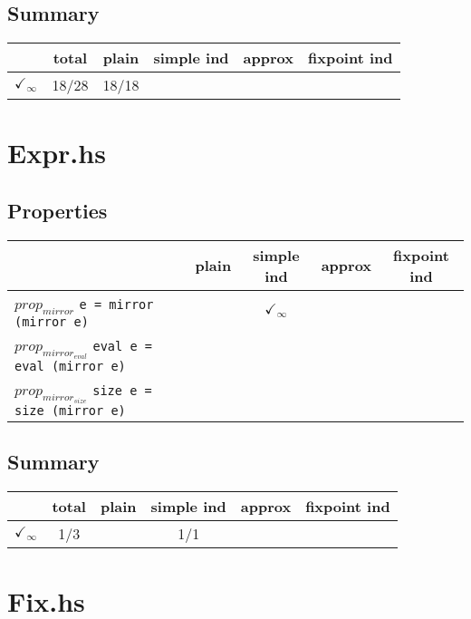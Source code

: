 \documentclass{article}
\begin{document}
\subsection*{Summary}
\begin{longtable}{p{4cm} || c | c | c | c | c | }
  & total & plain & simple ind & approx & fixpoint ind \\
\hline
$\checkmark_{\infty}$ & 18/28 & 18/18 &  &  & \\
\end{longtable}

\section*{Expr.hs}
\subsection*{Properties}
\begin{longtable}{p{10cm} || c | c | c | c | }
  & plain & simple ind & approx & fixpoint ind \\
\hline
$prop_{mirror}$ \newline \verb`e = mirror (mirror e)` &  & $\checkmark_{\infty}$ &  &  \\
\hline
$prop_{mirror_{eval}}$ \newline \verb`eval e = eval (mirror e)` &  &  &  &  \\
\hline
$prop_{mirror_{size}}$ \newline \verb`size e = size (mirror e)` &  &  &  &  \\
\end{longtable}

\subsection*{Summary}
\begin{longtable}{p{4cm} || c | c | c | c | c | }
  & total & plain & simple ind & approx & fixpoint ind \\
\hline
$\checkmark_{\infty}$ & 1/3 &  & 1/1 &  & \\
\end{longtable}

\section*{Fix.hs}
\end{document}
